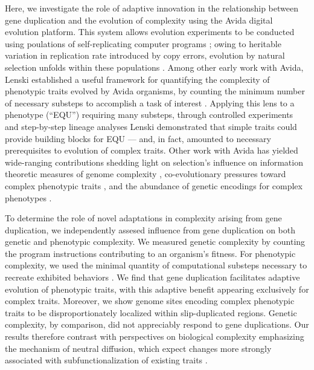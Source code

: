 Here, we investigate the role of adaptive innovation in the relationship between gene duplication and the evolution of complexity using the Avida digital evolution platform.
This system allows evolution experiments to be conducted using poulations of self-replicating computer programs \citep{Ofria:2009avida};
owing to heritable variation in replication rate introduced by copy errors, evolution by natural selection unfolds within these populations \citep{pennock2007models}.
Among other early work with Avida, Lenski established a useful framework for quantifying the complexity of phenotypic traits evolved by Avida organisms, by counting the minimum number of necessary substeps to accomplish a task of interest \citet{lenski2003evolutionary}.
Applying this lens to a phenotype  (``EQU'') requiring many substeps, through controlled experiments and step-by-step lineage analyses Lenski demonstrated that simple traits could provide building blocks for EQU --- and, in fact, amounted to necessary prerequisites to evolution of complex traits.
Other work with Avida has yielded wide-ranging contributions shedding light on selection's influence on information theoretic measures of genome complexity \citep{Adami2000Evolution}, co-evolutionary pressures toward complex phenotypic traits \citep{Zaman2014Coevolution}, and the abundance of genetic encodings for complex phenotypes \citep{Fortuna2017GenotypePhenotype}.

To determine the role of novel adaptations in complexity arising from gene duplication, we independently assesed influence from gene duplication on both genetic and phenotypic complexity.
We measured genetic complexity by counting the program instructions contributing to an organism's fitness.
For phenotypic complexity, we used the minimal quantity of computational substeps necessary to recreate exhibited behaviors \citet{lenski2003evolutionary}.
We find that gene duplication facilitates adaptive evolution of phenotypic traits, with this adaptive benefit appearing exclusively for complex traits.
Moreover, we show genome sites encoding complex phenotypic traits to be disproportionately localized within slip-duplicated regions.
Genetic complexity, by comparison, did not appreciably respond to gene duplications.
Our results therefore contrast with perspectives on biological complexity emphasizing the mechanism of neutral diffusion, which expect changes more strongly associated with subfunctionalization of existing traits \citep{TODO}.

